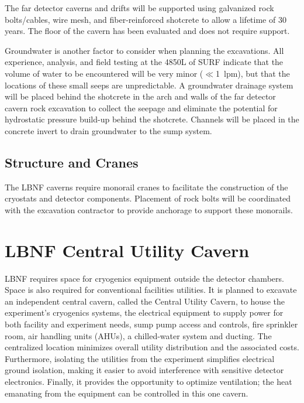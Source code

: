 The far detector %
caverns and drifts will be supported using galvanized rock bolts/cables, wire mesh, and fiber-reinforced shotcrete to allow a lifetime of 30 years. The floor of the cavern %
has been evaluated and does not require support.  

Groundwater is another factor to consider when planning the excavations. All experience, analysis, and field testing at the 4850L of SURF indicate that the volume of water to be encountered will be very minor ($\ll$1~lpm),  but that the locations of these small seeps are unpredictable. %
A groundwater drainage system will be placed behind the shotcrete in the arch and walls of the far detector cavern rock excavation to collect %
the seepage and eliminate the potential for hydrostatic pressure build-up behind the shotcrete. Channels will be placed in the concrete invert to drain groundwater to the sump system. 


\subsection{Structure and Cranes}
\label{sec:fscf-excav-cranes}

The LBNF caverns require monorail cranes to facilitate the construction of the cryostats and detector components. Placement of rock bolts will be coordinated with the excavation contractor to provide anchorage to support these monorails.

\section{LBNF Central Utility Cavern}
\label{sec:fscf-excav-util-cav}

LBNF requires space for cryogenics equipment outside the detector chambers. Space is also required for conventional facilities utilities. It is planned to excavate an independent central cavern, called  the Central Utility Cavern, to house the experiment's cryogenics systems, the electrical equipment to supply power for both facility and experiment needs, sump pump access and controls, fire sprinkler room, air handling units (AHUs), a chilled-water system and ducting. The centralized location minimizes overall utility distribution and the associated costs. Furthermore, isolating the utilities from the experiment simplifies electrical ground isolation, making it easier to avoid interference with sensitive detector electronics. Finally, it provides the opportunity to optimize ventilation; the heat emanating from the equipment can be controlled in this one cavern. 


